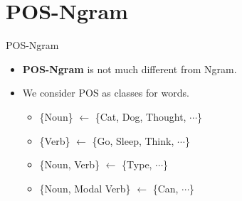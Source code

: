\documentclass{beamer}
\begin{document}
\section{POS-Ngram}
\begin{frame}{POS-Ngram}
    \begin{itemize}
        \item \textbf{POS-Ngram} is not much different from Ngram.\\
        \item We consider POS as classes for words.
            \begin{itemize}
                \item \{Noun\} $\leftarrow$ \{Cat, Dog, Thought, $\cdots$\}
                \item \{Verb\} $\leftarrow$ \{Go, Sleep, Think, $\cdots$\}
                \item \{Noun, Verb\} $\leftarrow$ \{Type, $\cdots$\}
                \item \{Noun, Modal Verb\} $\leftarrow$ \{Can, $\cdots$\}
            \end{itemize}
    \end{itemize}
\end{frame}
\end{document}
